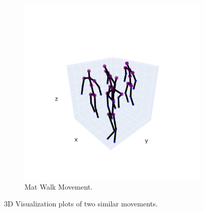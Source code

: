 \begin{figure}[h]
\begin{subfigure}{.5\textwidth}
                  \includegraphics[width=1.\linewidth]{../src/resources/plots/movements/mov-8.png}
                  \caption{Mat Walk Movement.}
                  \label{fig: mat-walk}
                \end{subfigure}
                \caption{3D Visualization plots of two similar movements.}
            \end{figure}

\cleardoublepage
